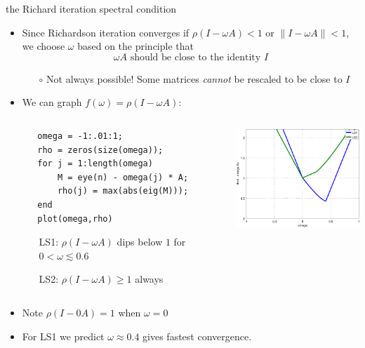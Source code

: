\documentclass[10pt,hyperref]{beamer}
\begin{document}
\begin{frame}[fragile]{the Richard iteration spectral condition}

\begin{itemize}
\item Since Richardson iteration converges if $\rho(I - \omega A)<1$ or $\|I-\omega A\|<1$, we choose $\omega$ based on the principle that
    $$\omega A \text{ should be close to the identity } I$$
\vspace{-5mm}
  \begin{itemize}
  \item[$\circ$] Not always possible!  Some matrices \emph{cannot} be rescaled to be close to $I$
  \end{itemize}

\medskip
\item We can graph $f(\omega) = \rho(I-\omega A)$:

\medskip
\begin{columns}
\begin{column}{0.5\textwidth}
\footnotesize
\begin{verbatim}
   omega = -1:.01:1;
   rho = zeros(size(omega));
   for j = 1:length(omega)
       M = eye(n) - omega(j) * A;
       rho(j) = max(abs(eig(M)));
   end
   plot(omega,rho)
\end{verbatim}

\smallskip
\begin{itemize}
\footnotesize
\item[LS1:]  $\rho(I - \omega A)$ dips below $1$ for $0 < \omega \lesssim 0.6$
\item[LS2:]  $\rho(I - \omega A) \ge 1$ always
\end{itemize}
\end{column}

\begin{column}{0.4\textwidth}
\includegraphics[width=2.0in,keepaspectratio=true]{richardspect}
\end{column}
\end{columns}

\medskip
\item  Note $\rho(I-0A)=1$ when $\omega=0$
\item  For LS1 we predict $\omega \approx 0.4$ gives fastest convergence.
\end{itemize}
\end{frame}
\end{document}
